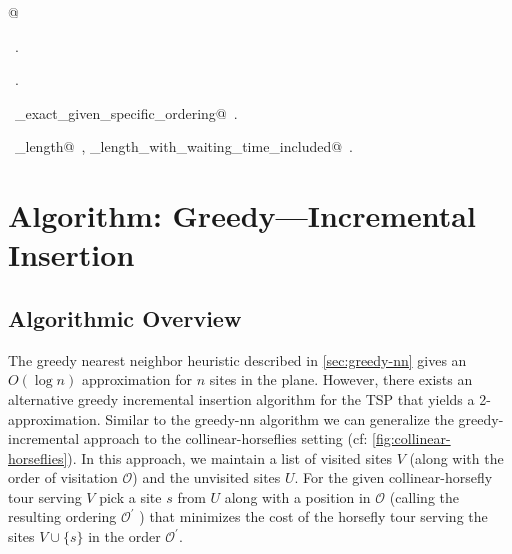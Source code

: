 \documentclass[11.5pt]{report}
\begin{document}
\begin{flushleft}
\begin{list}{}{}
\mbox{}\verb@   @\\
\mbox{}\verb@@{\NWsep}
\end{list}
\vspace{-1.5ex}
\footnotesize
\begin{list}{}{\setlength{\itemsep}{-\parsep}\setlength{\itemindent}{-\leftmargin}}
\item \NWtxtMacroDefBy\ .
\item \NWtxtMacroRefIn\ .
\item \NWtxtIdentsDefed\nobreak\  \verb@algo_exact_given_specific_ordering@\nobreak\ .\item \NWtxtIdentsUsed\nobreak\  \verb@tour_length@\nobreak\ , \verb@tour_length_with_waiting_time_included@\nobreak\ .
\item{}
\end{list}
\vspace{4ex}
\end{flushleft}
\section{Algorithm: Greedy---Incremental Insertion}
\subsection*{Algorithmic Overview}
\newchunk The greedy nearest neighbor heuristic described in \autoref{sec:greedy-nn} gives an $O(\log n)$ 
          approximation for $n$ sites in the plane. However, there exists an alternative greedy incremental 
          insertion algorithm for the TSP that yields a 2-approximation. Similar to the greedy-nn algorithm 
          we can generalize the greedy-incremental approach to the collinear-horseflies setting 
          (cf: \autoref{fig:collinear-horseflies}). 
\newchunk In this approach, we maintain a list of visited sites $V$ (along with the order of visitation 
          $\mathcal{O}$) and the unvisited sites $U$. For the given collinear-horsefly tour serving $V$ 
          pick a site $s$ from $U$ along with a position in $\mathcal{O}$ (calling the resulting ordering  
          $\mathcal{O^{'}}$  ) that minimizes the cost of the horsefly tour serving the sites $V \cup \{s\}$ 
          in the order $\mathcal{O^{'}}$. 
\end{document}
